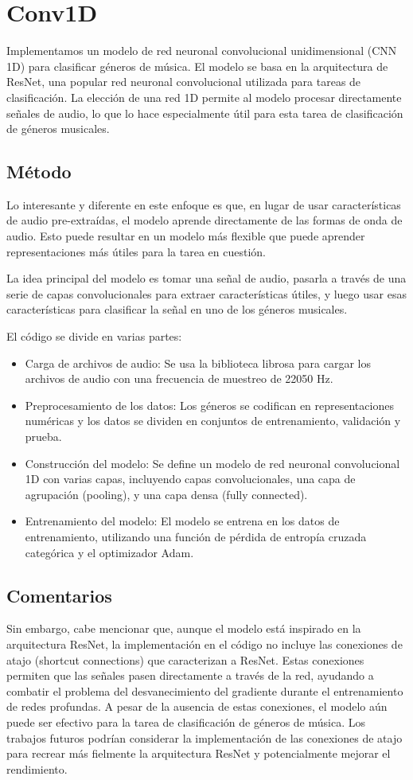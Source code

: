 \documentclass[colorinlistoftodos,twoside,twocolumn,10pt]{article} %
\begin{document}
\section{Conv1D}
Implementamos un modelo de red neuronal convolucional unidimensional (CNN 1D) para clasificar géneros de música. El modelo se basa en la arquitectura de ResNet, una popular red neuronal convolucional utilizada para tareas de clasificación. La elección de una red 1D permite al modelo procesar directamente señales de audio, lo que lo hace especialmente útil para esta tarea de clasificación de géneros musicales.

\subsection{Método}
Lo interesante y diferente en este enfoque es que, en lugar de usar características de audio pre-extraídas, el modelo aprende directamente de las formas de onda de audio. Esto puede resultar en un modelo más flexible que puede aprender representaciones más útiles para la tarea en cuestión.

La idea principal del modelo es tomar una señal de audio, pasarla a través de una serie de capas convolucionales para extraer características útiles, y luego usar esas características para clasificar la señal en uno de los géneros musicales.

El código se divide en varias partes:
\begin{itemize}
\item Carga de archivos de audio: Se usa la biblioteca librosa para cargar los archivos de audio con una frecuencia de muestreo de 22050 Hz.
\item Preprocesamiento de los datos: Los géneros se codifican en representaciones numéricas y los datos se dividen en conjuntos de entrenamiento, validación y prueba.
\item Construcción del modelo: Se define un modelo de red neuronal convolucional 1D con varias capas, incluyendo capas convolucionales, una capa de agrupación (pooling), y una capa densa (fully connected).
\item Entrenamiento del modelo: El modelo se entrena en los datos de entrenamiento, utilizando una función de pérdida de entropía cruzada categórica y el optimizador Adam.
\end{itemize}

\subsection{Comentarios}
Sin embargo, cabe mencionar que, aunque el modelo está inspirado en la arquitectura ResNet, la implementación en el código no incluye las conexiones de atajo (shortcut connections) que caracterizan a ResNet. Estas conexiones permiten que las señales pasen directamente a través de la red, ayudando a combatir el problema del desvanecimiento del gradiente durante el entrenamiento de redes profundas. A pesar de la ausencia de estas conexiones, el modelo aún puede ser efectivo para la tarea de clasificación de géneros de música. Los trabajos futuros podrían considerar la implementación de las conexiones de atajo para recrear más fielmente la arquitectura ResNet y potencialmente mejorar el rendimiento.
\end{document}
